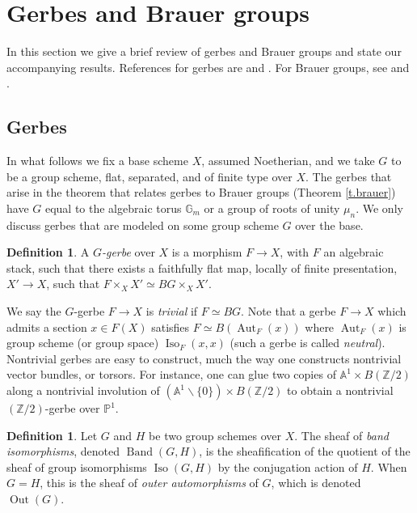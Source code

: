\documentclass[12pt]{amsart}
\newcommand{\Z}{{\mathbb Z}}
\newcommand{\G}{{\mathbb G}}
\newcommand{\bP}{{\mathbb P}}
\newcommand{\A}{{\mathbb A}}
\DeclareMathOperator{\Iso}{Iso}
\DeclareMathOperator{\Out}{Out}
\DeclareMathOperator{\Aut}{Aut}
\DeclareMathOperator{\band}{Band}
\theoremstyle{plain}
\theoremstyle{definition}
\newtheorem  {defn} [thm] {Definition}
\theoremstyle{remark}
\begin{document}
\section{Gerbes and Brauer groups} \label{s.stacksgerbes}
In this section we give a brief review of gerbes and
Brauer groups and 
state our accompanying results.
References for gerbes are \cite{Mi} and \cite{L-MB}.
For Brauer groups, see \cite{Gr} and \cite{Mi}.

\subsection{Gerbes}
In what follows we fix a base scheme $X$, assumed Noetherian, and we
take $G$ to be a group scheme, flat, separated, and of finite type over $X$.
The gerbes that arise in the theorem that relates gerbes to Brauer groups
(Theorem \ref{t.brauer}) have $G$ equal to the
algebraic torus $\G_m$ or a group of roots of unity $\mu_n$.
We only discuss gerbes that are modeled on some group scheme $G$ over
the base.

\begin{defn}
A {\it $G$-gerbe} over $X$ is a morphism $F\to X$, with
$F$ an algebraic stack,
such that there exists a faithfully flat map, locally of finite presentation,
$X'\to X$, such that $F\times_XX'\simeq BG\times_XX'$.
\end{defn}

We say the $G$-gerbe $F\to X$ is {\em trivial} if $F\simeq BG$.
Note that a gerbe $F\to X$ which admits a section $x\in F(X)$ satisfies
$F\simeq B(\Aut_F(x))$ where $\Aut_F(x)$ is group scheme
(or group space)
$\Iso_F(x,x)$
(such a gerbe is called {\em neutral}).
Nontrivial gerbes are easy to construct, much the way one constructs
nontrivial vector bundles, or torsors.
For instance, one can glue two copies of $\A^1\times B(\Z/2)$ along a
nontrivial involution of $(\A^1\smallsetminus\{0\})\times B(\Z/2)$
to obtain a nontrivial $(\Z/2)$-gerbe over $\bP^1$.

\begin{defn}
Let $G$ and $H$ be two group schemes over $X$.
The sheaf of {\it band isomorphisms}, denoted
$\band(G, H)$, is the sheafification of the quotient of the sheaf of group
isomorphisms $\Iso(G, H)$ by the conjugation action of $H$.
When $G=H$, this is the sheaf of {\it outer automorphisms} of $G$,
which is denoted $\Out(G)$.
\end{defn}

%
\end{document}
